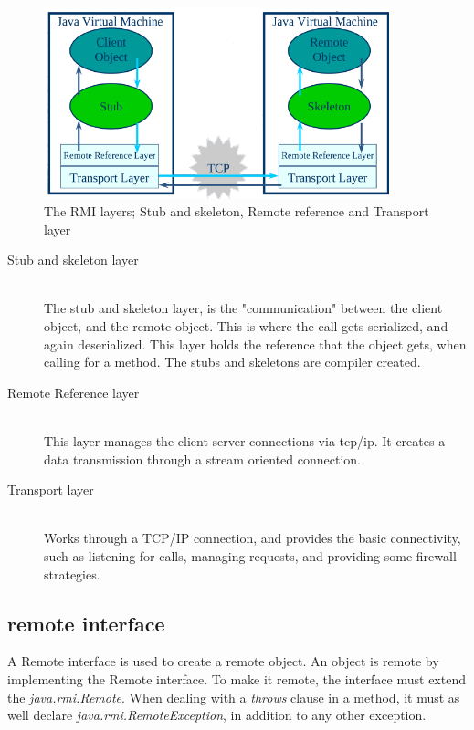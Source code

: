 \begin{figure}[ht!]
\centering
\includegraphics[width=100mm]{img/RMI_layer.png}
\caption{The RMI layers; Stub and skeleton, Remote reference and Transport layer}
\label{Remote Layers}
\end{figure}

\begin{description}
 \item[Stub and skeleton layer] \hfill \\
The stub and skeleton layer, is the "communication" between the client object, and the remote object. This is where the call gets serialized, and again deserialized. This layer holds the reference that the object gets, when calling for a method. The stubs and skeletons are compiler created.

 \item[Remote Reference layer] \hfill \\

This layer manages the client server connections via tcp/ip. It creates a data transmission through a stream oriented connection.

 \item[Transport layer] \hfill \\

Works through a TCP/IP connection, and provides the basic connectivity, such as listening for calls, managing requests, and providing some firewall strategies.
\end{description}

\subsection{remote interface}
A Remote interface is used to create a remote object. An object is remote by implementing the Remote interface. To make it remote, the interface must extend the \emph{java.rmi.Remote}. When dealing with a \emph{throws} clause in a method, it must as well declare \emph{java.rmi.RemoteException}, in addition to any other exception.\\

